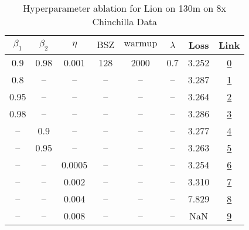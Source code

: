 \begin{table}[H]
\centering
\caption{Hyperparameter ablation for Lion on 130m on 8x Chinchilla Data}
\label{tab:ablation_lion_130m_8}
\begin{tabular}{cccccccc}
\toprule
$\beta_1$ & $\beta_2$ & $\eta$ & $\mathrm{BSZ}$ & $\mathrm{warmup}$ & $\lambda$ & Loss & Link \\
\midrule
0.9 & 0.98 & 0.001 & 128 & 2000 & 0.7 & 3.252 & \href{https://wandb.ai/stanford-mercury/optimizer-scaling/runs/sweep-130m-21B-lion85b813lr0.001-wd0.7-minlr0-warmup2000-b10.9-b-eef545}{0} \\
\midrule
0.8 & -- & -- & -- & -- & -- & 3.287 & \href{https://wandb.ai/stanford-mercury/optimizer-scaling/runs/sweep-130m-21B-lionje7bccblr0.001-wd0.7-minlr0-warmup2000-b10.8--46199a}{1} \\
0.95 & -- & -- & -- & -- & -- & 3.264 & \href{https://wandb.ai/stanford-mercury/optimizer-scaling/runs/sweep-130m-21B-lionjc17beflr0.001-wd0.7-minlr0-warmup2000-b10.95-bd5017}{2} \\
0.98 & -- & -- & -- & -- & -- & 3.286 & \href{https://wandb.ai/stanford-mercury/optimizer-scaling/runs/sweep-130m-21B-liona1354cclr0.001-wd0.7-minlr0-warmup2000-b10.98-b74486}{3} \\
-- & 0.9 & -- & -- & -- & -- & 3.277 & \href{https://wandb.ai/stanford-mercury/optimizer-scaling/runs/sweep-130m-21B-liona9ff1b8lr0.001-wd0.7-minlr0-warmup2000-b10.9--9c346c}{4} \\
-- & 0.95 & -- & -- & -- & -- & 3.263 & \href{https://wandb.ai/stanford-mercury/optimizer-scaling/runs/sweep-130m-21B-lionje4e710lr0.001-wd0.7-minlr0-warmup2000-b10.9--f5263e}{5} \\
-- & -- & 0.0005 & -- & -- & -- & 3.254 & \href{https://wandb.ai/stanford-mercury/optimizer-scaling/runs/sweep-130m-21B-lionja6ac62lr0.0005-wd0.7-minlr0-warmup2000-b10.9-39f7c0}{6} \\
-- & -- & 0.002 & -- & -- & -- & 3.310 & \href{https://wandb.ai/stanford-mercury/optimizer-scaling/runs/sweep-130m-21B-lionj40577alr0.002-wd0.7-minlr0-warmup2000-b10.9--92e8ac}{7} \\
-- & -- & 0.004 & -- & -- & -- & 7.829 & \href{https://wandb.ai/stanford-mercury/optimizer-scaling/runs/sweep-130m-21B-lionj145f08lr0.004-wd0.7-minlr0-warmup2000-b10.9--a84f14}{8} \\
-- & -- & 0.008 & -- & -- & -- & NaN & \href{https://wandb.ai/stanford-mercury/optimizer-scaling/runs/sweep-130m-21B-lionjdc0918lr0.008-wd0.7-minlr0-warmup2000-b10.9--498ad5}{9} \\

\end{tabular}
\end{table}
